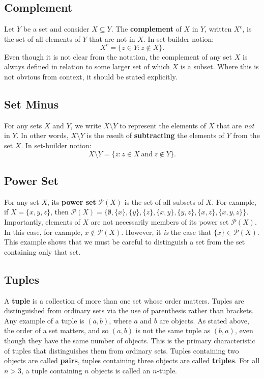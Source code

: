 \documentclass[11pt]{article}
\theoremstyle{definition}
\theoremstyle{remark}
\begin{document}
\subsection{Complement}
Let $Y$ be a set and consider $X\subseteq Y$. The \textbf{complement} of $X$ in $Y$, written $X^{c}$, is the set of all elements of $Y$ that are not in $X$. In set-builder notion:
$$X^{c}=\{z\in Y:z\not\in X\}.$$
Even though it is not clear from the notation, the complement of any set $X$ is always defined in relation to some larger set of which $X$ is a subset. Where this is not obvious from context, it should be stated explicitly. 

\subsection{Set Minus}
For any sets $X$ and $Y$, we write $X\setminus Y$ to represent the elements of $X$ that are \textit{not} in $Y$. In other words, $X\setminus Y$ is the result of \textbf{subtracting} the elements of $Y$ from the set $X$. In set-builder notion:
$$X\setminus Y = \{z:z\in X \ \text{and} \ z\not\in Y\}.$$

\subsection{Power Set}
For any set $X$, its \textbf{power set} $\mathcal{P}(X)$ is the set of all subsets of $X$. For example, if $X=\{x,y,z\}$, then $\mathcal{P}(X)=\{\emptyset,\{x\},\{y\},\{z\},\{x,y\},\{y,z\},\{x,z\},\{x,y,z\}\}$. Importantly, elements of $X$ are not necessarily members of its power set $\mathcal{P}(X)$. In this case, for example, $x\not\in\mathcal{P}(X)$. However, it \textit{is} the case that $\{x\}\in\mathcal{P}(X)$. This example shows that we must be careful to distinguish a set from the set containing only that set.

\subsection{Tuples}
A \textbf{tuple} is a collection of more than one set whose order matters. Tuples are distinguished from ordinary sets via the use of parenthesis rather than brackets. Any example of a tuple is $(a,b)$, where $a$ and $b$ are objects. As stated above, the order of a set matters, and so $(a,b)$ is not the same tuple as $(b,a)$, even though they have the same number of objects. This is the primary characteristic of tuples that distinguishes them from ordinary sets. Tuples containing two objects are called \textbf{pairs}, tuples containing three objects are called \textbf{triples}. For all $n>3$, a tuple containing $n$ objects is called an $n$-tuple.\par 
\end{document}
